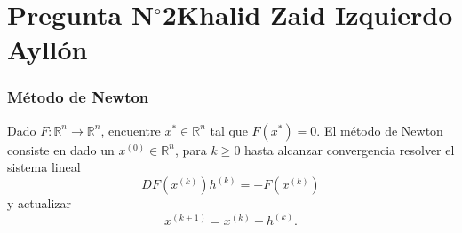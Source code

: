 \section{Pregunta N$^{\circ}$2\qquad Khalid Zaid Izquierdo Ayllón}

\begin{frame}
	\frametitle{Método de Newton}
	Dado $F\colon\mathbb{R}^{n}\to\mathbb{R}^{n}$, encuentre
	$x^{\ast}\in\mathbb{R}^{n}$ tal que $F\left(x^{\ast}\right)=0$.
	El \alert{método de Newton} consiste en dado un
	$x^{\left(0\right)}\in\mathbb{R}^{n}$, para $k\geq0$
	hasta alcanzar convergencia resolver el sistema lineal
	\begin{equation*}
		DF
		\left(x^{\left(k\right)}\right)
		h^{\left(k\right)}=
		-F\left(x^{\left(k\right)}\right)
	\end{equation*}
	y actualizar
	\begin{equation*}
		x^{\left(k+1\right)}=
		x^{\left(k\right)}+
		h^{\left(k\right)}.
	\end{equation*}

\end{frame}

